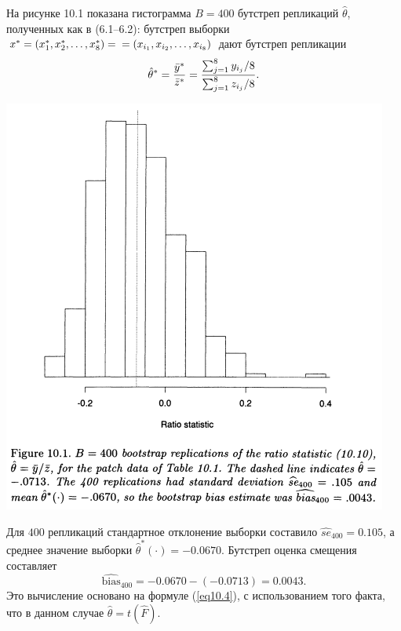 На рисунке 10.1 показана гистограмма $B = 400$ бутстреп репликаций $\hat{\theta}$, полученных как в (6.1--6.2): бутстреп выборки $x^{*} = (x_{1}^{*}, x_{2}^{*}, \dots, x_{8}^{*}) =\\=(x_{i_1}, x_{i_2}, \dots, x_{i_8})$ дают бутстреп репликации
\begin{equation}\label{eq10.12}
   \hat{\theta}^{*} = \frac{\Bar{y}^{*}}{\Bar{z}^{*}} = \frac{\sum_{j=1}^{8}y_{i_j}/8}{\sum_{j=1}^{8}z_{i_j}/8}.
\end{equation}

\noindent
\includegraphics[width=\linewidth]{10/f10.1.png}
\newline

Для $400$ репликаций стандартное отклонение выборки составило $\widehat{se}_{400} = 0.105$, а среднее значение выборки $\hat{\theta}^{*}(\cdot) = -0.0670$. Бутстреп оценка смещения составляет
\begin{equation}\label{eq10.12}
   \widehat{\text{bias}}_{400} = -0.0670 - (-0.0713) = 0.0043.
\end{equation}
Это вычисление основано на формуле (\ref{eq10.4}), с использованием того факта, что в данном случае $\hat{\theta} = t(\hat{F})$.

